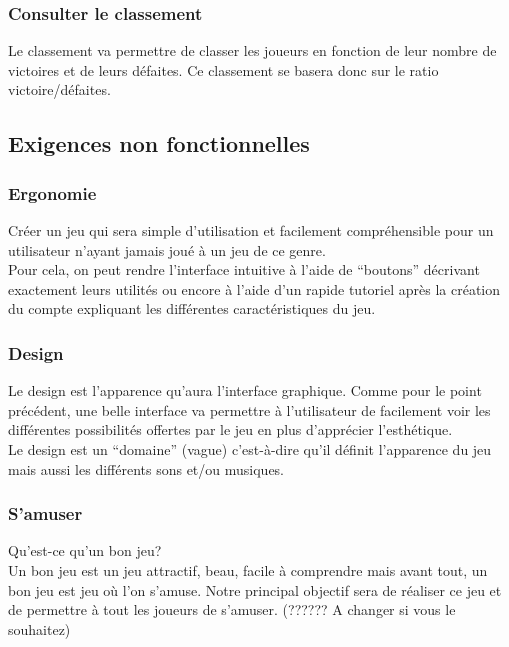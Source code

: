 \documentclass[11pt,a4paper]{article}
\begin{document}
  \subsubsection{Consulter le classement}
    Le classement va permettre de classer les joueurs en fonction de leur nombre de victoires et de leurs défaites. Ce classement se basera donc sur le ratio victoire/défaites. 
 


\subsection{Exigences non fonctionnelles}
\label{sec:exi-nonfonc}

  \subsubsection{Ergonomie}
    Créer un jeu qui sera simple d'utilisation et facilement compréhensible pour un utilisateur n'ayant jamais joué à un jeu de ce genre.\\
    Pour cela, on peut rendre l'interface intuitive à l'aide de ``boutons'' décrivant exactement leurs utilités ou encore à l'aide d'un rapide tutoriel après la création du compte expliquant les différentes caractéristiques du jeu.

  \subsubsection{Design}
    Le design est l'apparence qu'aura l'interface graphique. Comme pour le point précédent, une belle interface va permettre à l'utilisateur de facilement voir les différentes possibilités offertes par le jeu en plus d'apprécier l’esthétique.\\
    Le design est un ``domaine'' (vague) c'est-à-dire qu'il définit l'apparence du jeu mais aussi les différents sons et/ou musiques.

  \subsubsection{S'amuser}
    Qu'est-ce qu'un bon jeu?\\
    Un bon jeu est un jeu attractif, beau, facile à comprendre mais avant tout, un bon jeu est jeu où l'on s'amuse. Notre principal objectif sera de réaliser ce jeu et de permettre à tout les joueurs de s'amuser. (?????? A changer si vous le souhaitez)
\end{document}
